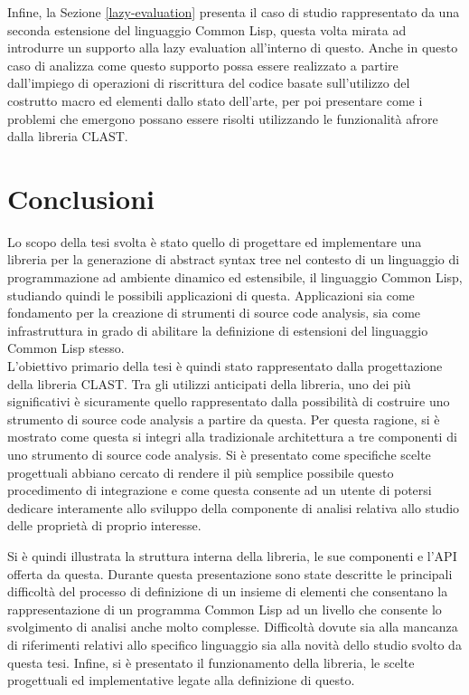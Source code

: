 \documentclass{book}
\begin{document}
Infine, la Sezione \ref{lazy-evaluation} presenta il caso di studio
rappresentato da una seconda estensione del linguaggio Common Lisp, questa volta
mirata ad introdurre un supporto alla lazy evaluation all’interno di questo.
Anche in questo caso di analizza come questo supporto possa essere realizzato a
partire dall’impiego di operazioni di riscrittura del codice basate
sull’utilizzo del costrutto macro ed elementi dallo stato dell’arte, per poi
presentare come i problemi che emergono possano essere risolti utilizzando le
funzionalità afrore dalla libreria CLAST.





\endgroup

\chapter{Conclusioni}

Lo scopo della tesi svolta è stato quello di progettare ed implementare una
libreria per la generazione di abstract syntax tree nel contesto di un
linguaggio di programmazione ad ambiente dinamico ed estensibile, il linguaggio
Common Lisp, studiando quindi le possibili applicazioni di questa. Applicazioni
sia come fondamento per la creazione di strumenti di source code analysis, sia
come infrastruttura in grado di abilitare la definizione di estensioni del
linguaggio Common Lisp stesso.\\

L'obiettivo primario della tesi è quindi stato rappresentato dalla progettazione
della libreria CLAST. Tra gli utilizzi anticipati della libreria, uno dei più
significativi è sicuramente quello rappresentato dalla possibilità di costruire
uno strumento di source code analysis a partire da questa. Per questa ragione,
si è mostrato come questa si integri alla tradizionale architettura a tre
componenti di uno strumento di source code analysis. Si è presentato come
specifiche scelte progettuali abbiano cercato di rendere il più semplice
possibile questo procedimento di integrazione e come questa consente ad un
utente di potersi dedicare interamente allo sviluppo della componente di analisi
relativa allo studio delle proprietà di proprio interesse.

Si è quindi illustrata la struttura interna della libreria, le sue componenti e
l'API offerta da questa. Durante questa presentazione sono state descritte le
principali difficoltà del processo di definizione di un insieme di elementi che
consentano la rappresentazione di un programma Common Lisp ad un livello che
consente lo svolgimento di analisi anche molto complesse. Difficoltà dovute sia
alla mancanza di riferimenti relativi allo specifico linguaggio sia alla novità
dello studio svolto da questa tesi. Infine, si è presentato il funzionamento
della libreria, le scelte progettuali ed implementative legate alla definizione
di questo.\\
\end{document}
